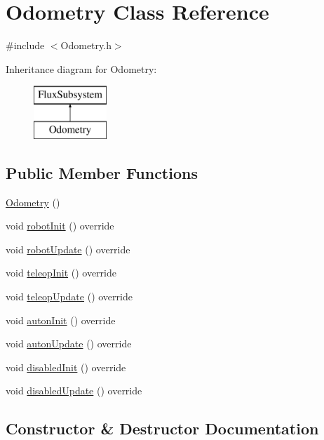 \hypertarget{classOdometry}{}\section{Odometry Class Reference}
\label{classOdometry}


{\ttfamily \#include $<$Odometry.\+h$>$}

Inheritance diagram for Odometry\+:\begin{figure}[H]
\begin{center}
\leavevmode
\includegraphics[height=2.000000cm]{classOdometry}
\end{center}
\end{figure}
\subsection*{Public Member Functions}
\begin{DoxyCompactItemize}
\item 
\hyperlink{classOdometry_a54b672ac09bd117fa04773f131492c35}{Odometry} ()
\item 
void \hyperlink{classOdometry_a84379c5878ad6dd502297e6f956298f9}{robot\+Init} () override
\item 
void \hyperlink{classOdometry_a4c82fa784546795d6b0bf32c1b919202}{robot\+Update} () override
\item 
void \hyperlink{classOdometry_adea396ff746c1f3ad73ea79d19a75356}{teleop\+Init} () override
\item 
void \hyperlink{classOdometry_ae42a153c786b5c805b073509394951f9}{teleop\+Update} () override
\item 
void \hyperlink{classOdometry_a0ec037096f65e779248e6a99615f37ed}{auton\+Init} () override
\item 
void \hyperlink{classOdometry_a5a19f4d904e5364ca75a91f97a8777a6}{auton\+Update} () override
\item 
void \hyperlink{classOdometry_a0df3b0180a8fa5a01a9e441de112140e}{disabled\+Init} () override
\item 
void \hyperlink{classOdometry_aef83c6c62c8e992b20759aec705c2ee8}{disabled\+Update} () override
\end{DoxyCompactItemize}


\subsection{Constructor \& Destructor Documentation}
\mbox{\label{classOdometry_a54b672ac09bd117fa04773f131492c35}} 

